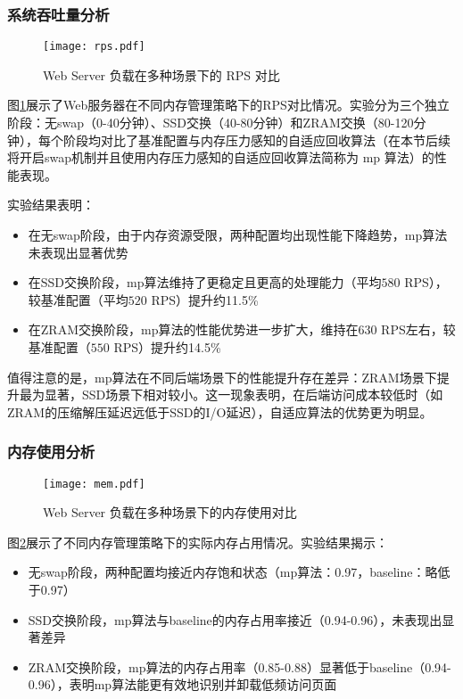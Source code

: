 \subsubsection{系统吞吐量分析}
\begin{figure}[htbp]
    \centering
    \texttt{[image: rps.pdf]}
    \caption{Web Server 负载在多种场景下的 RPS 对比}
    \label{fig:rps}
\end{figure}
图\ref{fig:rps}展示了Web服务器在不同内存管理策略下的RPS对比情况。实验分为三个独立阶段：无swap（0-40分钟）、SSD交换（40-80分钟）和ZRAM交换（80-120分钟），每个阶段均对比了基准配置与内存压力感知的自适应回收算法（在本节后续将开启swap机制并且使用内存压力感知的自适应回收算法简称为 mp 算法）的性能表现。

实验结果表明：
\begin{itemize}
    \item 在无swap阶段，由于内存资源受限，两种配置均出现性能下降趋势，mp算法未表现出显著优势
    \item 在SSD交换阶段，mp算法维持了更稳定且更高的处理能力（平均$580$ RPS），较基准配置（平均$520$ RPS）提升约11.5\%
    \item 在ZRAM交换阶段，mp算法的性能优势进一步扩大，维持在$630$ RPS左右，较基准配置（$550$ RPS）提升约14.5\%
\end{itemize}

值得注意的是，mp算法在不同后端场景下的性能提升存在差异：ZRAM场景下提升最为显著，SSD场景下相对较小。这一现象表明，在后端访问成本较低时（如ZRAM的压缩解压延迟远低于SSD的I/O延迟），自适应算法的优势更为明显。

\subsubsection{内存使用分析}
\begin{figure}[htbp]
    \centering
    \texttt{[image: mem.pdf]}
    \caption{Web Server 负载在多种场景下的内存使用对比}
    \label{fig:mem}
\end{figure}
图\ref{fig:mem}展示了不同内存管理策略下的实际内存占用情况。实验结果揭示：
\begin{itemize}
    \item 无swap阶段，两种配置均接近内存饱和状态（mp算法：0.97，baseline：略低于0.97）
    \item SSD交换阶段，mp算法与baseline的内存占用率接近（0.94-0.96），未表现出显著差异
    \item ZRAM交换阶段，mp算法的内存占用率（0.85-0.88）显著低于baseline（0.94-0.96），表明mp算法能更有效地识别并卸载低频访问页面
\end{itemize}

